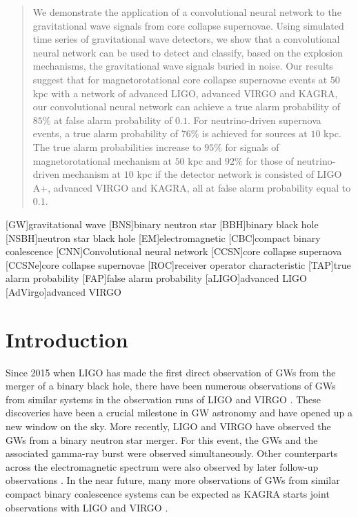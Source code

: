 \documentclass[aps,twocolumn,showpacs,groupedaddress, nofootinbib]{revtex4}  %
\begin{document}
\begin{abstract}
We demonstrate the application of a convolutional neural network 
to the gravitational wave signals from core collapse supernovae.
Using simulated time series of gravitational wave detectors, 
we show that a convolutional neural network can be used to detect and classify, based on the explosion mechanisms,  
the gravitational wave signals buried in noise.
Our results suggest that for magnetorotational core collapse supernovae events at $50$ kpc
with a network of advanced LIGO, advanced VIRGO and KAGRA, our convolutional neural network 
can achieve a true alarm probability of $85\%$ at false alarm probability of $0.1$.
For neutrino-driven supernova events, a true alarm probability of $76\%$ is achieved for sources at $10$ kpc.
The true alarm probabilities increase to $95\%$ for signals of magnetorotational mechanism at $50$ kpc and $92\%$ for those of neutrino-driven mechanism at $10$ kpc 
if the detector network is consisted of LIGO A+, advanced VIRGO and KAGRA,  all at false alarm probability equal to $0.1$.

\end{abstract}
\pacs{}
\maketitle
{}[GW]{gravitational wave}
[BNS]{binary neutron star}
[BBH]{binary black hole}
[NSBH]{neutron star black hole}
[EM]{electromagnetic}
[CBC]{compact binary coalescence}
[CNN]{Convolutional neural network}
[CCSN]{core collapse supernova}
[CCSNe]{core collapse supernovae}
[ROC]{receiver operator characteristic}
[TAP]{true alarm probability}
[FAP]{false alarm probability}
[aLIGO]{advanced LIGO}
[AdVirgo]{advanced VIRGO}

\section{Introduction}
Since 2015 when LIGO has made the first direct observation of \acp{GW} from the merger of a binary black hole\cite{abbott2016observation},
there have been numerous observations of \acp{GW} from similar systems in the observation runs of LIGO 
and VIRGO \cite{abbott2016gw151226, abbott2017gw170608, abbott2017gw170814}.
These discoveries have been a crucial milestone in \ac{GW} astronomy and have opened up a new window on the sky.
More recently, LIGO and VIRGO have observed the \acp{GW} from a binary neutron star merger\cite{abbott2017gw170817, abbott2017gravitational, abbott2017multi}.
For this event, the \acp{GW} and the associated gamma-ray burst were observed simultaneously. 
Other counterparts across the electromagnetic spectrum were also observed by later follow-up observations \cite{abbott2017multi}.
In the near future, many more observations of \acp{GW} from similar compact binary coalescence systems can be expected
as KAGRA starts joint observations with LIGO and VIRGO \cite{aso2013interferometer, somiya2012detector, abbott2018prospects}.
\end{document}
